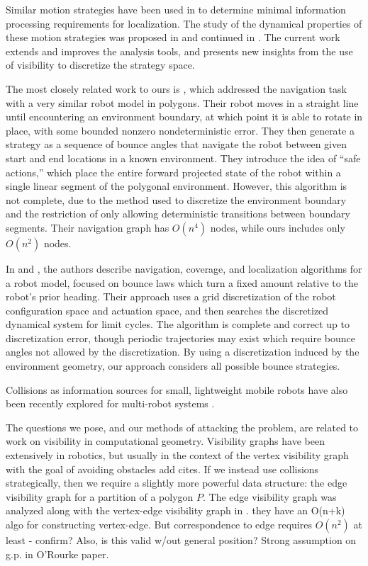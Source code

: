 \documentclass[]{styles/svproc}  %
\begin{document}
Similar motion strategies have been used in \cite{OkaLav06} to determine minimal
information processing requirements for localization. The study of the dynamical
properties of these motion strategies was proposed in \cite{bounce} and
continued in \cite{NilBecLav17}. The current work extends and improves the analysis tools, and presents new insights from the use of visibility to discretize the
strategy space.

The most closely related work to ours is \cite{LewOKa13}, which addressed the
navigation task with a very similar robot model in polygons. Their robot moves
in a straight line until encountering an environment boundary, at which point it
is able to rotate in place, with some bounded nonzero nondeterministic error.
They then generate a strategy as a sequence of bounce angles that navigate
the robot between given start and end locations in a known environment. They
introduce the idea of ``safe actions,'' which place the entire forward projected
state of the robot within a single linear segment of the polygonal environment.
However, this algorithm is not complete, due to the method used to discretize
the environment boundary and the restriction of only allowing deterministic
transitions between boundary segments. Their navigation graph has $O(n^4)$
nodes, while ours includes only $O(n^2)$ nodes.



In \cite{alam2017minimalist} and \cite{alam2018space}, the authors describe
navigation, coverage, and localization algorithms for a robot model, focused
on bounce laws which turn a fixed amount relative to the robot's prior heading. 
Their approach uses a grid discretization of the robot configuration space and actuation
space, and then searches the discretized dynamical system for limit cycles. The
algorithm is complete and correct up to discretization error, though periodic
trajectories may exist which require bounce angles not allowed by the
discretization. By using a discretization induced by the environment geometry,
our approach considers all possible bounce strategies.

Collisions as information sources for small, lightweight mobile robots have also been
recently explored for multi-robot systems \cite{mayya2017collisions}.


The questions we pose, and our methods of attacking the problem, are related to
work on visibility in computational geometry. Visibility graphs have been
extensively in robotics, but usually in the context of the vertex visibility
graph with the goal of avoiding obstacles {\color{red} add cites}.  If we instead use collisions strategically, then we require a slightly more
powerful data structure: the edge visibility graph for a partition of a polygon
$P$. The edge visibility graph was analyzed along with the vertex-edge
visibility graph in \cite{rourke_viz}. {\color{red} they have an O(n+k) algo for
constructing vertex-edge. But correspondence to edge requires $O(n^2)$ at least
- confirm? Also, is this valid w/out general position? Strong assumption on g.p.
in O'Rourke paper}.
\end{document}
